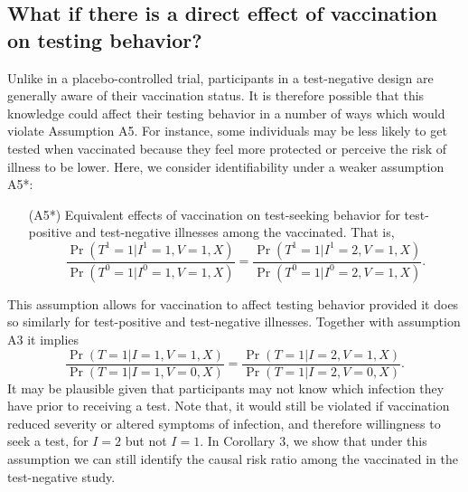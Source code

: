 \begin{appendix}
\subsection{What if there is a direct effect of vaccination on testing behavior?}
Unlike in a placebo-controlled trial, participants in a test-negative design are generally aware of their vaccination status. It is therefore possible that this knowledge could affect their testing behavior in a number of ways which would violate Assumption A5. For instance, some individuals may be less likely to get tested when vaccinated because they feel more protected or perceive the risk of illness to be lower. Here, we consider identifiability under a weaker assumption A5*:
\begin{itemize}
    \item[(A5*)] Equivalent effects of vaccination on test-seeking behavior for test-positive and test-negative illnesses among the vaccinated. That is, 
    \begin{equation}
    \dfrac{\Pr(T^1 = 1 | I^1 = 1, V = 1, X)}{\Pr(T^0 = 1 | I^0 = 1, V = 1, X)} = \dfrac{\Pr(T^1 = 1 | I^1 = 2, V = 1, X)}{\Pr(T^0 = 1 | I^0 = 2, V = 1, X)}.
\end{equation}
\end{itemize}
This assumption allows for vaccination to affect testing behavior provided it does so similarly for test-positive and test-negative illnesses. Together with assumption A3 it implies
\begin{equation*}
    \dfrac{\Pr(T = 1 | I = 1, V = 1, X)}{\Pr(T = 1 | I = 1, V = 0, X)} = \dfrac{\Pr(T = 1 | I = 2, V = 1, X)}{\Pr(T = 1 | I = 2, V = 0, X)}.
\end{equation*}
It may be plausible given that participants may not know which infection they have prior to receiving a test. Note that, it would still be violated if vaccination reduced severity or altered symptoms of infection, and therefore willingness to seek a test, for $I=2$ but not $I=1$. In Corollary 3, we show that under this assumption we can still identify the causal risk ratio among the vaccinated in the test-negative study. 
\vspace{1em}




\end{appendix}
